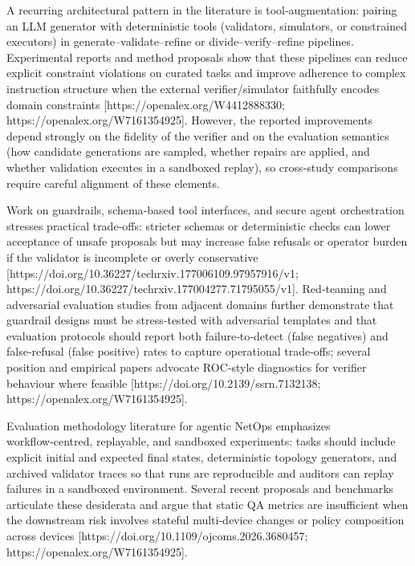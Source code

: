\documentclass[conference]{IEEEtran}
\begin{document}
A recurring architectural pattern in the literature is tool‑augmentation: pairing an LLM generator with deterministic tools (validators, simulators, or constrained executors) in generate--validate--refine or divide--verify--refine pipelines. Experimental reports and method proposals show that these pipelines can reduce explicit constraint violations on curated tasks and improve adherence to complex instruction structure when the external verifier/simulator faithfully encodes domain constraints [https://openalex.org/W4412888330; https://openalex.org/W7161354925]. However, the reported improvements depend strongly on the fidelity of the verifier and on the evaluation semantics (how candidate generations are sampled, whether repairs are applied, and whether validation executes in a sandboxed replay), so cross‑study comparisons require careful alignment of these elements.

Work on guardrails, schema‑based tool interfaces, and secure agent orchestration stresses practical trade‑offs: stricter schemas or deterministic checks can lower acceptance of unsafe proposals but may increase false refusals or operator burden if the validator is incomplete or overly conservative [https://doi.org/10.36227/techrxiv.177006109.97957916/v1; https://doi.org/10.36227/techrxiv.177004277.71795055/v1]. Red‑teaming and adversarial evaluation studies from adjacent domains further demonstrate that guardrail designs must be stress‑tested with adversarial templates and that evaluation protocols should report both failure‑to‑detect (false negatives) and false‑refusal (false positive) rates to capture operational trade‑offs; several position and empirical papers advocate ROC‑style diagnostics for verifier behaviour where feasible [https://doi.org/10.2139/ssrn.7132138; https://openalex.org/W7161354925].

Evaluation methodology literature for agentic NetOps emphasizes workflow‑centred, replayable, and sandboxed experiments: tasks should include explicit initial and expected final states, deterministic topology generators, and archived validator traces so that runs are reproducible and auditors can replay failures in a sandboxed environment. Several recent proposals and benchmarks articulate these desiderata and argue that static QA metrics are insufficient when the downstream risk involves stateful multi‑device changes or policy composition across devices [https://doi.org/10.1109/ojcoms.2026.3680457; https://openalex.org/W7161354925].
\end{document}
